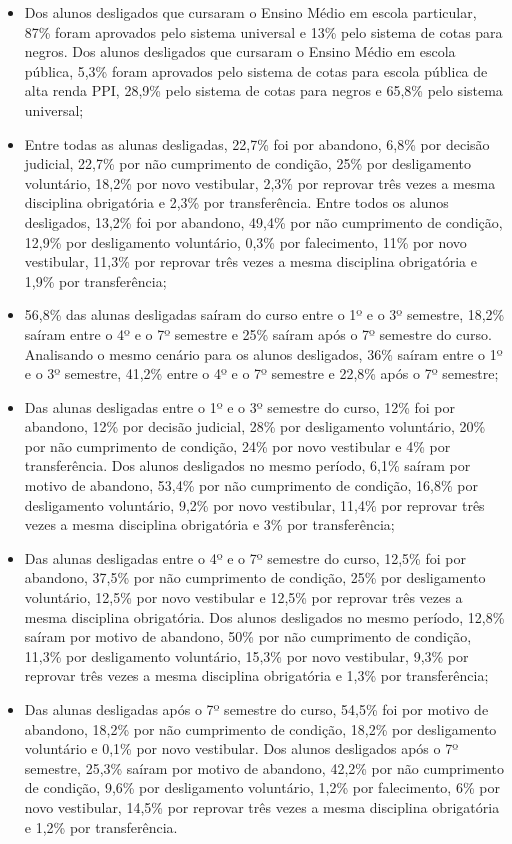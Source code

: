 \begin{itemize}
	
	\item Dos alunos desligados que cursaram o Ensino Médio em escola particular, 87\% foram aprovados pelo sistema universal e  13\% pelo sistema de cotas para negros. Dos alunos desligados que cursaram o Ensino Médio em escola pública, 5,3\% foram aprovados pelo sistema de cotas para escola pública de alta renda PPI, 28,9\% pelo sistema de cotas para negros e 65,8\% pelo sistema universal; 
	
	\item Entre todas as alunas desligadas, 22,7\% foi por abandono, 6,8\% por decisão judicial, 22,7\% por não cumprimento de condição, 25\% por desligamento voluntário, 18,2\% por novo vestibular, 2,3\% por reprovar três vezes a mesma disciplina obrigatória e 2,3\% por transferência. 	Entre todos os alunos desligados, 13,2\% foi por abandono, 49,4\% por não cumprimento de condição, 12,9\% por desligamento voluntário, 0,3\% por falecimento, 11\% por novo vestibular, 11,3\% por reprovar três vezes a mesma disciplina obrigatória e 1,9\% por transferência;
	
	\item 56,8\% das alunas desligadas saíram do curso entre o 1º e o 3º semestre, 18,2\% saíram entre o 4º e o 7º semestre e 25\% saíram após o 7º semestre do curso. Analisando o mesmo cenário para os alunos desligados, 36\% saíram entre o 1º e o 3º semestre, 41,2\% entre o 4º e o 7º semestre e 22,8\% após o 7º semestre;
	
	\item Das alunas desligadas entre o 1º e o 3º semestre do curso, 12\% foi por abandono, 12\% por decisão judicial, 28\% por desligamento voluntário, 20\% por não cumprimento de condição, 24\% por novo vestibular e 4\% por transferência. Dos alunos desligados no mesmo período, 6,1\% saíram por motivo de abandono,  53,4\% por não cumprimento de condição, 16,8\% por desligamento voluntário, 9,2\% por novo vestibular, 11,4\% por reprovar três vezes a mesma disciplina obrigatória e 3\% por transferência;
	
	\item Das alunas desligadas entre o 4º e o 7º semestre do curso, 12,5\% foi por abandono, 37,5\% por não cumprimento de condição, 25\% por desligamento voluntário, 12,5\% por novo vestibular e 12,5\% por reprovar três vezes a mesma disciplina obrigatória.  Dos alunos desligados no mesmo período, 12,8\% saíram por motivo de abandono, 50\% por não cumprimento de condição, 11,3\% por desligamento voluntário, 15,3\% por novo vestibular, 9,3\% por reprovar três vezes a mesma disciplina obrigatória e 1,3\% por transferência; 
	
	\item Das alunas desligadas após o 7º semestre do curso, 54,5\% foi por motivo de abandono, 18,2\%  por não cumprimento de condição, 18,2\% por desligamento voluntário e 0,1\% por novo vestibular. Dos alunos desligados após o 7º semestre, 25,3\% saíram por motivo de abandono, 42,2\% por não cumprimento de condição, 9,6\% por desligamento voluntário, 1,2\% por falecimento, 6\% por novo vestibular, 14,5\% por reprovar três vezes a mesma disciplina obrigatória e 1,2\% por transferência.
\end{itemize}

